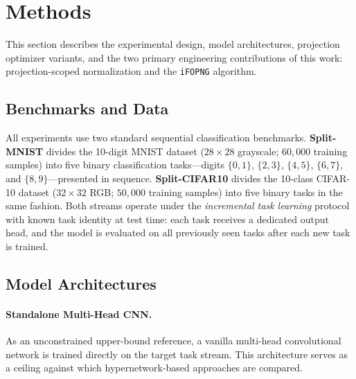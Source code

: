 \section{Methods}
\label{sec:methods}

This section describes the experimental design, model architectures, projection
optimizer variants, and the two primary engineering contributions of this work:
projection-scoped normalization and the \texttt{iFOPNG} algorithm.

\subsection{Benchmarks and Data}
All experiments use two standard sequential classification benchmarks.
\textbf{Split-MNIST} divides the 10-digit MNIST dataset
($28{\times}28$ grayscale; $60{,}000$ training samples) into five binary
classification tasks—digits $\{0,1\}$, $\{2,3\}$, $\{4,5\}$, $\{6,7\}$, and
$\{8,9\}$—presented in sequence.  \textbf{Split-CIFAR10} divides the 10-class
CIFAR-10 dataset ($32{\times}32$ RGB; $50{,}000$ training samples) into five
binary tasks in the same fashion.  Both streams operate under the
\emph{incremental task learning} protocol with known task identity at test time:
each task receives a dedicated output head, and the model is evaluated on
all previously seen tasks after each new task is trained.

\subsection{Model Architectures}
\paragraph{Standalone Multi-Head CNN.}
As an unconstrained upper-bound reference, a vanilla multi-head convolutional
network is trained directly on the target task stream.  This architecture
serves as a ceiling against which hypernetwork-based approaches are compared.

